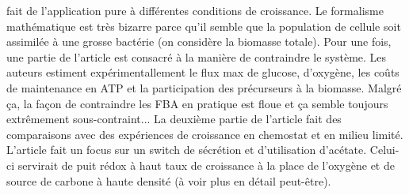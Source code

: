 \citet{varma_stoichiometric_1994} fait de l'application pure à différentes conditions de croissance. Le formalisme mathématique est très bizarre parce qu'il semble que la population de cellule soit assimilée à une grosse bactérie (on considère la biomasse totale). Pour une fois, une partie de l'article est consacré à la manière de contraindre le système. Les auteurs estiment expérimentallement le flux max de glucose, d'oxygène, les coûts de maintenance en ATP et la participation des précurseurs à la biomasse. Malgré ça, la façon de contraindre les FBA en pratique est floue et ça semble toujours extrêmement sous-contraint... La deuxième partie de l'article fait des comparaisons avec des expériences de croissance en chemostat et en milieu limité. L'article fait un focus sur un switch de sécrétion et d'utilisation d'acétate. Celui-ci servirait de puit rédox à haut taux de croissance à la place de l'oxygène et de source de carbone à haute densité (à voir plus en détail peut-être).
